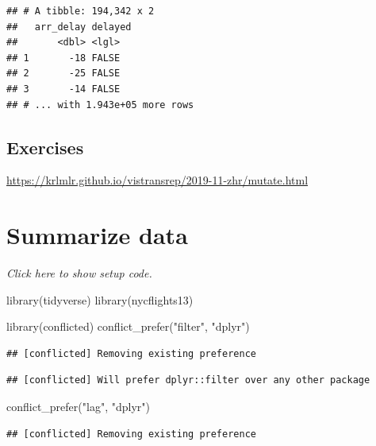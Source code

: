 \documentclass[]{book}
\newenvironment{Shaded}{}{}
\newcommand{\KeywordTok}[1]{\textcolor[rgb]{0.00,0.00,1.00}{#1}}
\newcommand{\NormalTok}[1]{#1}
\newcommand{\StringTok}[1]{\textcolor[rgb]{0.00,0.50,0.50}{#1}}
\begin{document}
\begin{verbatim}
## # A tibble: 194,342 x 2
##   arr_delay delayed
##       <dbl> <lgl>  
## 1       -18 FALSE  
## 2       -25 FALSE  
## 3       -14 FALSE  
## # ... with 1.943e+05 more rows
\end{verbatim}

\hypertarget{exercises-4}{%
\subsection*{Exercises}\label{exercises-4}}

\url{https://krlmlr.github.io/vistransrep/2019-11-zhr/mutate.html}

\hypertarget{summarize-data}{%
\section{Summarize data}\label{summarize-data}}

\emph{Click here to show setup code.}

\begin{Shaded}
\begin{Highlighting}[]
\KeywordTok{library}\NormalTok{(tidyverse)}
\KeywordTok{library}\NormalTok{(nycflights13)}

\KeywordTok{library}\NormalTok{(conflicted)}
\KeywordTok{conflict_prefer}\NormalTok{(}\StringTok{"filter"}\NormalTok{, }\StringTok{"dplyr"}\NormalTok{)}
\end{Highlighting}
\end{Shaded}

\begin{verbatim}
## [conflicted] Removing existing preference
\end{verbatim}

\begin{verbatim}
## [conflicted] Will prefer dplyr::filter over any other package
\end{verbatim}

\begin{Shaded}
\begin{Highlighting}[]
\KeywordTok{conflict_prefer}\NormalTok{(}\StringTok{"lag"}\NormalTok{, }\StringTok{"dplyr"}\NormalTok{)}
\end{Highlighting}
\end{Shaded}

\begin{verbatim}
## [conflicted] Removing existing preference
\end{verbatim}
\end{document}

